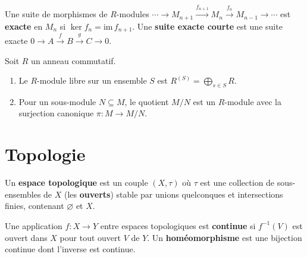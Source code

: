 \begin{definition}\label{def:rappel-suite-exacte}
Une suite de morphismes de $R$-modules
$\cdots \to M_{n+1} \xrightarrow{f_{n+1}} M_n
\xrightarrow{f_n} M_{n-1} \to \cdots$
est \textbf{exacte} en $M_n$ si $\ker f_n = \mathrm{im}\, f_{n+1}$.
Une \textbf{suite exacte courte} est une suite exacte
$0 \to A \xrightarrow{f} B \xrightarrow{g} C \to 0$.
\end{definition}

\begin{definition}\label{def:rappel-algebre-libre}
Soit $R$ un anneau commutatif.
\begin{enumerate}[label=(\roman*)]
\item Le $R$-module libre sur un ensemble $S$ est
      $R^{(S)} = \bigoplus_{s \in S} R$.
\item Pour un sous-module $N \subseteq M$, le quotient $M/N$ est
      un $R$-module avec la surjection canonique $\pi \colon M \to M/N$.
\end{enumerate}
\end{definition}


\section{Topologie}\label{sec:rappels-topologie}


\begin{definition}\label{def:rappel-topologique}
Un \textbf{espace topologique} est un couple $(X, \tau)$ où $\tau$
est une collection de sous-ensembles de $X$ (les \textbf{ouverts})
stable par unions quelconques et intersections finies, contenant
$\varnothing$ et $X$.
\end{definition}

\begin{definition}
\label{def:rappel-continue}
Une application $f \colon X \to Y$ entre espaces topologiques est
\textbf{continue} si $f^{-1}(V)$ est ouvert dans $X$ pour tout
ouvert $V$ de $Y$.  Un \textbf{homéomorphisme} est une bijection
continue dont l'inverse est continue.
\end{definition}

